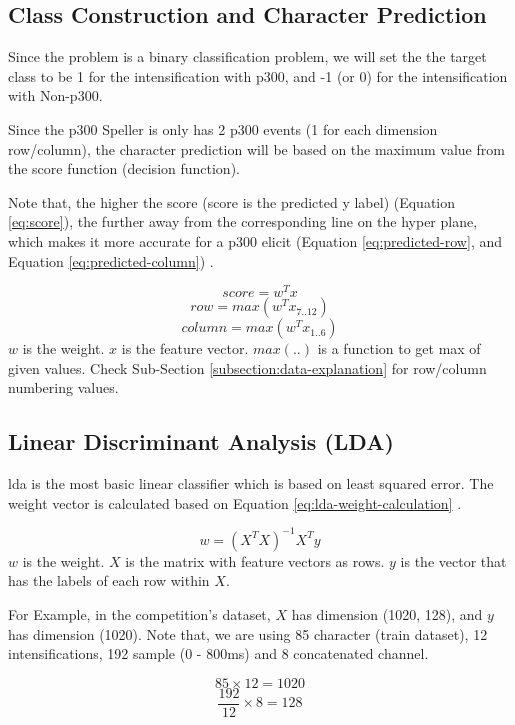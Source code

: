 \subsection{Class Construction and Character Prediction}
Since the problem is a binary classification problem, we will set the the target class to be 1 for the intensification with \ac{p300}, and -1 (or 0) for the intensification with Non-\ac{p300}.\par
Since the \ac{p300} Speller is only has 2 \ac{p300} events (1 for each dimension row/column), the character prediction will be based on the maximum value from the score function (decision function).\par
Note that, the higher the score (score is the predicted y label) (Equation \ref{eq:score}), the further away from the corresponding line on the hyper plane, which makes it more accurate for a \ac{p300} elicit (Equation \ref{eq:predicted-row}, and Equation \ref{eq:predicted-column}) \cite{inproceedings1, inproceedings2, article1}.\par
\begin{equation}
    score = w^T x
    \label{eq:score}
\end{equation}
\begin{equation}
    row = max(w^T x_{7..12})
    \label{eq:predicted-row}
\end{equation}
\begin{equation}
    column = max(w^T x_{1..6})
    \label{eq:predicted-column}
\end{equation}
$w$ is the weight. $x$ is the feature vector. $max(..)$ is a function to get max of given values. Check Sub-Section \ref{subsection:data-explanation} for row/column numbering values.\par
\subsection{Linear Discriminant Analysis (LDA)}
\ac{lda} is the most basic linear classifier which is based on least squared error. The weight vector is calculated based on Equation \ref{eq:lda-weight-calculation} \cite{inproceedings1}.\par
\begin{equation}
    w = (X^T X)^{-1} X^T y
    \label{eq:lda-weight-calculation}
\end{equation}
$w$ is the weight. $X$ is the matrix with feature vectors as rows. $y$ is the vector that has the labels of each row within $X$.\par
For Example, in the competition's dataset, $X$ has dimension (1020, 128), and $y$ has dimension (1020). Note that, we are using 85 character (train dataset), 12 intensifications, 192 sample (0 - 800ms) and 8 concatenated channel.\par
\[85 \times 12 = 1020\]
\[\frac{192}{12} \times 8 = 128\]


